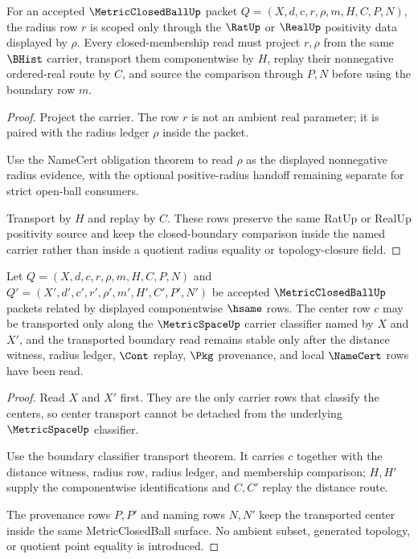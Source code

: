 \begin{theorem}
\label{thm:metric-closed-ball-radius-source-scope}
For an accepted $\MetricClosedBallUp$ packet $Q=(X,d,c,r,\rho,m,H,C,P,N)$, the radius row $r$ is scoped only through the $\RatUp$ or $\RealUp$ positivity data displayed by $\rho$. Every closed-membership read must project $r,\rho$ from the same $\BHist$ carrier, transport them componentwise by $H$, replay their nonnegative ordered-real route by $C$, and source the comparison through $P,N$ before using the boundary row $m$.
\end{theorem}
\begin{proof}
Project the carrier. The row $r$ is not an ambient real parameter; it is paired with the radius ledger $\rho$ inside the packet.

Use the NameCert obligation theorem to read $\rho$ as the displayed nonnegative radius evidence, with the optional positive-radius handoff remaining separate for strict open-ball consumers.

Transport by $H$ and replay by $C$. These rows preserve the same RatUp or RealUp positivity source and keep the closed-boundary comparison inside the named carrier rather than inside a quotient radius equality or topology-closure field.
\end{proof}

\begin{theorem}
\label{thm:metric-closed-ball-center-transport-scope}
Let $Q=(X,d,c,r,\rho,m,H,C,P,N)$ and $Q'=(X',d',c',r',\rho',m',H',C',P',N')$ be accepted $\MetricClosedBallUp$ packets related by displayed componentwise $\hsame$ rows. The center row $c$ may be transported only along the $\MetricSpaceUp$ carrier classifier named by $X$ and $X'$, and the transported boundary read remains stable only after the distance witness, radius ledger, $\Cont$ replay, $\Pkg$ provenance, and local $\NameCert$ rows have been read.
\end{theorem}
\begin{proof}
Read $X$ and $X'$ first. They are the only carrier rows that classify the centers, so center transport cannot be detached from the underlying $\MetricSpaceUp$ classifier.

Use the boundary classifier transport theorem. It carries $c$ together with the distance witness, radius row, radius ledger, and membership comparison; $H,H'$ supply the componentwise identifications and $C,C'$ replay the distance route.

The provenance rows $P,P'$ and naming rows $N,N'$ keep the transported center inside the same MetricClosedBall surface. No ambient subset, generated topology, or quotient point equality is introduced.
\end{proof}

